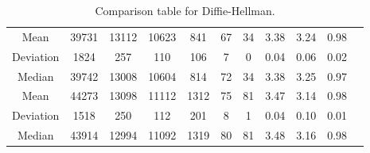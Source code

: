 \begin{table}[!ht]
{{\begin{tabular}{c|ccc|ccc|ccc|l}
        \multicolumn{1}{c|}{Mean}      & 39731                                               & 13112                                   & 10623                                  & 841     & 67       & 34       & 3.38    & 3.24     & 0.98     & \multicolumn{1}{c}{}                                                                           \\ \cline{1-10}
        \multicolumn{1}{c|}{Deviation} & 1824                                                & 257                                     & 110                                    & 106     & 7        & 0        & 0.04    & 0.06     & 0.02     & \multicolumn{1}{c}{}                                                                           \\ \cline{1-10}
        \multicolumn{1}{c|}{Median}    & 39742                                               & 13008                                   & 10604                                  & 814     & 72       & 34       & 3.38    & 3.25     & 0.97     & \multicolumn{1}{c}{\parbox[t]{1em}{}}  \\ \hline

        \multicolumn{1}{c|}{Mean}      & 44273                                               & 13098                                   & 11112                                  & 1312    & 75       & 81       & 3.47    & 3.14     & 0.98     & \multicolumn{1}{c}{}                                                                           \\ \cline{1-10}
        \multicolumn{1}{c|}{Deviation} & 1518                                                & 250                                     & 112                                    & 201     & 8        & 1        & 0.04    & 0.10     & 0.01     & \multicolumn{1}{c}{}                                                                           \\ \cline{1-10}
        \multicolumn{1}{c|}{Median}    & 43914                                               & 12994                                   & 11092                                  & 1319    & 80       & 81       & 3.48    & 3.16     & 0.98     & \multicolumn{1}{c}{\parbox[t]{1em}{}} \\
      \end{tabular}
    }
  }
  \caption{Comparison table for Diffie-Hellman.}
  \label{tab:DH}
\end{table}